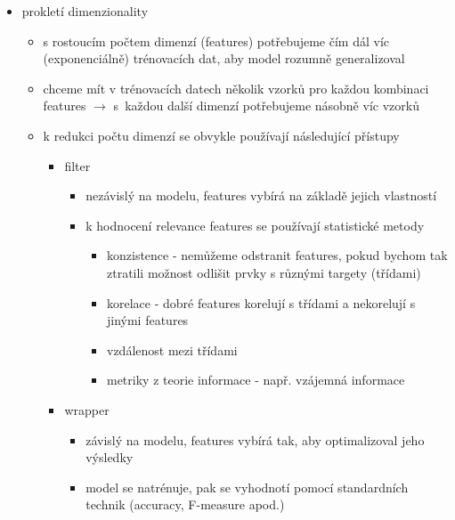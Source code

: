 \begin{itemize}
\begin{itemize}
\item jak bojovat s overfittingem
\begin{itemize}
\item $L^2$ regularizací
\item early stoppingem (s trénováním přestaneme, když začne validační chyba růst)
\item vhodným nastavením learning ratu $\alpha$ (případně volbou rozumného learning rate schedule)
\end{itemize}
\end{itemize}
\item prokletí dimenzionality
\begin{itemize}
\item s rostoucím počtem dimenzí (features) potřebujeme čím dál víc (exponenciálně) trénovacích dat, aby model rozumně generalizoval
\item chceme mít v trénovacích datech několik vzorků pro každou kombinaci features $\to$ s~každou další dimenzí potřebujeme násobně víc vzorků
\item k redukci počtu dimenzí se obvykle používají následující přístupy
\begin{itemize}
\item filter
\begin{itemize}
\item nezávislý na modelu, features vybírá na základě jejich vlastností
\item k hodnocení relevance features se používají statistické metody
\begin{itemize}
\item konzistence - nemůžeme odstranit features, pokud bychom tak ztratili možnost odlišit prvky s různými targety (třídami)
\item korelace - dobré features korelují s třídami a nekorelují s jinými features
\item vzdálenost mezi třídami
\item metriky z teorie informace - např. vzájemná informace
\end{itemize}
\end{itemize}
\item wrapper
\begin{itemize}
\item závislý na modelu, features vybírá tak, aby optimalizoval jeho výsledky
\item model se natrénuje, pak se vyhodnotí pomocí standardních technik (accuracy, F-measure apod.)
\end{itemize}
\end{itemize}
\end{itemize}
\end{itemize}
